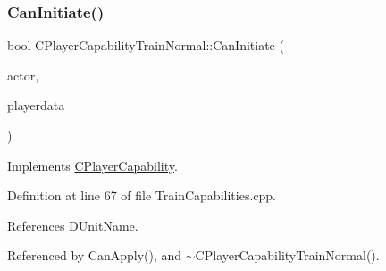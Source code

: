 \subsubsection{\texorpdfstring{Can\+Initiate()}{CanInitiate()}}
{\footnotesize\ttfamily bool C\+Player\+Capability\+Train\+Normal\+::\+Can\+Initiate (\begin{DoxyParamCaption}\item[{std\+::shared\+\_\+ptr$<$ \hyperlink{classCPlayerAsset}{C\+Player\+Asset} $>$}]{actor,  }\item[{std\+::shared\+\_\+ptr$<$ \hyperlink{classCPlayerData}{C\+Player\+Data} $>$}]{playerdata }\end{DoxyParamCaption})\hspace{0.3cm}{\ttfamily [virtual]}}



Implements \hyperlink{classCPlayerCapability_aa83b1e1fcaff2985c378132d679154ea}{C\+Player\+Capability}.



Definition at line 67 of file Train\+Capabilities.\+cpp.



References D\+Unit\+Name.



Referenced by Can\+Apply(), and $\sim$\+C\+Player\+Capability\+Train\+Normal().


